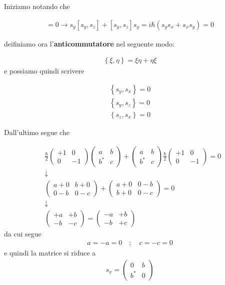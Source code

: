 Iniziamo notando che

\begin{align}
[s_y^2, s_z]=0 \rightarrow s_y[s_y,s_z] + [s_y,s_z]s_y = i\hbar (s_ys_x + s_xs_y)=0
\end{align}

deifiniamo ora l'\textbf{anticommutatore} nel seguente modo:

\begin{align}
\left\{\xi,\eta\right\}= \xi\eta + \eta\xi
\end{align}
e possiamo quindi scrivere

\begin{align}
\left\{s_y,s_x\right\}=0 \\
\left\{s_y,s_z\right\}=0 \\
\left\{s_z,s_x\right\}=0
\end{align}

Dall'ultimo segue che

\begin{align}
{}&\frac{\hbar}{2}\left(
\begin{array}{ccc}
+1 & 0 \\
0 & -1
\end{array}
\right)
\left(
\begin{array}{ccc}
a & b \\
b^* & c
\end{array}
\right) + 
\left(
\begin{array}{ccc}
a & b \\
b^* & c
\end{array}
\right)
\frac{\hbar}{2}\left(
\begin{array}{ccc}
+1 & 0 \\
0 & -1
\end{array}
\right)=0 \nonumber \\
&\downarrow \nonumber \\
&\left(
\begin{array}{ccc}
a + 0 & b+0 \\
0-b & 0-c
\end{array}
\right) + 
\left(
\begin{array}{ccc}
a + 0 & 0-b \\
b+0 & 0-c
\end{array}
\right)=0 \nonumber \\
&\downarrow \nonumber \\
& \left(
\begin{array}{ccc}
+a  & +b \\
-b & -c
\end{array}
\right) = 
\left(
\begin{array}{ccc}
-a  & +b \\
-b & +c
\end{array}
\right)
\end{align}
da cui segue
\begin{align}
a= - a =0 \quad ; \quad c=-c=0
\end{align}
e quindi la matrice si riduce a 
\begin{align}
s_x = \left(
\begin{array}{ccc}
0 & b \\
b^* & 0
\end{array}
\right)
\end{align}

